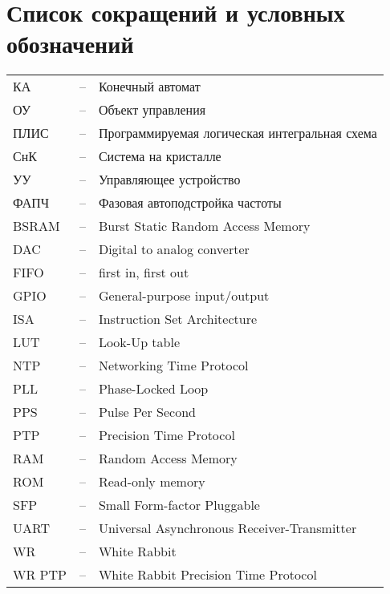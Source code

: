 \chapter*{Список сокращений и условных обозначений}             %
\noindent
\addtocounter{table}{-1}%

\noindent
\begin{tabular}{lcl}
КА & -- & Конечный автомат\\
ОУ & -- & Объект управления\\
ПЛИС & -- & Программируемая логическая интегральная схема\\
СнК & -- & Система на кристалле\\
УУ & -- & Управляющее устройство\\
ФАПЧ & -- & Фазовая автоподстройка частоты\\
BSRAM & -- & Burst Static Random Access Memory\\
DAC & -- & Digital to analog converter\\
FIFO & -- & first in, first out\\
GPIO & -- & General-purpose input/output\\
ISA & -- & Instruction Set Architecture\\
LUT & -- & Look-Up table\\
NTP & -- & Networking Time Protocol\\
PLL & -- & Phase-Locked Loop\\
PPS & -- & Pulse Per Second\\
PTP & -- & Precision Time Protocol\\
RAM & -- & Random Access Memory\\
ROM & -- & Read-only memory\\
SFP & -- & Small Form-factor Pluggable\\
UART & -- & Universal Asynchronous Receiver-Transmitter\\
WR & -- & White Rabbit\\
WR PTP & -- & White Rabbit Precision Time Protocol\\
\end{tabular}